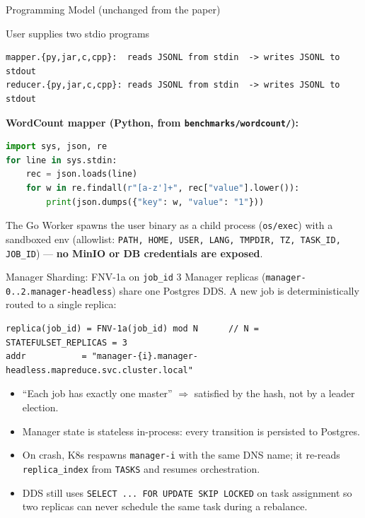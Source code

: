 \documentclass[11pt]{beamer}
\begin{document}
\begin{frame}[fragile]{Programming Model (unchanged from the paper)}
\begin{block}{User supplies two stdio programs}
\begin{lstlisting}
mapper.{py,jar,c,cpp}:  reads JSONL from stdin  -> writes JSONL to stdout
reducer.{py,jar,c,cpp}: reads JSONL from stdin  -> writes JSONL to stdout
\end{lstlisting}
\end{block}

\textbf{WordCount mapper (Python, from \texttt{benchmarks/wordcount/}):}
\begin{lstlisting}[language=Python]
import sys, json, re
for line in sys.stdin:
    rec = json.loads(line)
    for w in re.findall(r"[a-z']+", rec["value"].lower()):
        print(json.dumps({"key": w, "value": "1"}))
\end{lstlisting}

\scriptsize
The Go Worker \alert{spawns the user binary as a child process}
(\texttt{os/exec}) with a sandboxed env (allowlist: \texttt{PATH, HOME, USER, LANG,
TMPDIR, TZ, TASK\_ID, JOB\_ID}) --- \textbf{no MinIO or DB credentials are exposed}.
\end{frame}

\begin{frame}[fragile]{Manager Sharding: FNV-1a on \texttt{job\_id}}
3 Manager replicas (\texttt{manager-0..2.manager-headless}) share one Postgres DDS.
A new job is \alert{deterministically routed} to a single replica:

\vspace{0.8em}
\begin{lstlisting}
replica(job_id) = FNV-1a(job_id) mod N      // N = STATEFULSET_REPLICAS = 3
addr           = "manager-{i}.manager-headless.mapreduce.svc.cluster.local"
\end{lstlisting}

\begin{itemize}\small
  \item ``Each job has exactly one master''  $\Rightarrow$ satisfied by the hash, not by a leader election.
  \item Manager state is \alert{stateless in-process}: every transition is persisted to Postgres.
  \item On crash, K8s respawns \texttt{manager-i} with the same DNS name;
        it re-reads \texttt{replica\_index} from \texttt{TASKS} and resumes orchestration.
  \item DDS still uses \alert{\texttt{SELECT ... FOR UPDATE SKIP LOCKED}} on task assignment
        so two replicas can never schedule the same task during a rebalance.
\end{itemize}
\end{frame}
\end{document}
